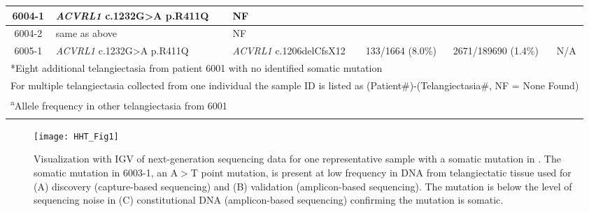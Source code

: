 \begin{sidewaystable}[]
\begin{tabularx}{\textheight}{c p{3.5cm} p{3.5cm} XXX}
6004-1 & \textit{ACVRL1} \newline c.1232G\textgreater{}A p.R411Q & NF &	 & & \\\hline
6004-2 & same as above & NF & & & \\\hline
6005-1 & \textit{ACVRL1} \newline c.1232G\textgreater{}A p.R411Q & \textit{ACVRL1} \newline c.1206delCfsX12 & 133/1664 (8.0\%) & 2671/189690 (1.4\%) & N/A \\
\bottomrule
\multicolumn{6}{l}{*Eight additional telangiectasia from patient 6001 with no identified somatic mutation} \\
\multicolumn{6}{l}{For multiple telangiectasia collected from one individual the sample ID is listed as (Patient\#)-(Telangiectasia\#, NF = None Found)} \\
\multicolumn{6}{l}{\textsuperscript{a}Allele frequency in other telangiectasia from 6001} \\
\label{HHT_Table_1}
\end{tabularx}
\end{sidewaystable}



\begin{figure}[tbp!]
\begin{center}
\texttt{[image: HHT\_Fig1]}
\end{center}
\caption[Low Frequency Somatic Mutations Detected in Telangiectasia.] {Visualization with IGV of next-generation sequencing data for one representative sample with a somatic mutation in . The somatic mutation in 6003-1, an A$>$T point mutation, is present at low frequency in DNA from telangiectatic tissue used for (A) discovery (capture-based sequencing) and (B) validation (amplicon-based sequencing). The mutation is below the level of sequencing noise in (C) constitutional DNA (amplicon-based sequencing) confirming the mutation is somatic.}

\label{HHT_Figure_1}
\end{figure}


